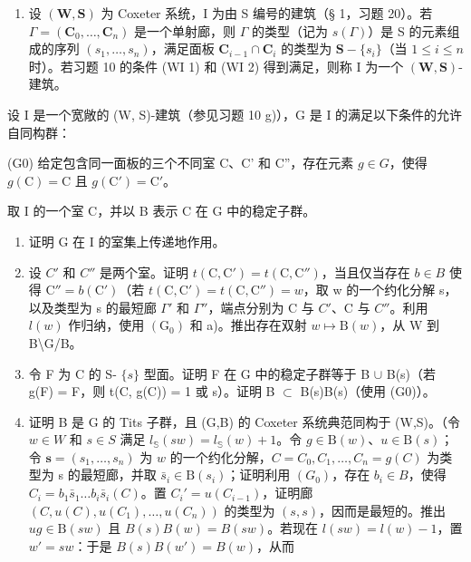\begin{enumerate}
\def\labelenumi{\arabic{enumi})}
\setcounter{enumi}{10}
\tightlist
\item
  设 \((\mathbf{W},\mathbf{S})\) 为 Coxeter 系统，I 为由 S 编号的建筑（§ 1，习题 20）。若 \(\Gamma = (\mathbf{C}_0,\dots ,\mathbf{C}_n)\) 是一个单射廊，则 \(\Gamma\) 的类型（记为 \(s(\Gamma)\)）是 S 的元素组成的序列 \((s_1,\ldots ,s_n)\)，满足面板 \(\mathbf{C}_{i - 1}\cap \mathbf{C}_i\) 的类型为 \(\mathbf{S} - \{s_i\}\)（当 \(1\leqslant i\leqslant n\) 时）。若习题 10 的条件 (WI 1) 和 (WI 2) 得到满足，则称 I 为一个 \((\mathbf{W},\mathbf{S})\)-建筑。
\end{enumerate}

设 I 是一个宽敞的 (W, S)-建筑（参见习题 10 g)），G 是 I 的满足以下条件的允许自同构群：

(G0) 给定包含同一面板的三个不同室 C、C' 和 C''，存在元素 \(g \in G\)，使得 \(g(\mathrm{C}) = \mathrm{C}\) 且 \(g(\mathrm{C}') = \mathrm{C}'\)。

取 I 的一个室 C，并以 B 表示 C 在 G 中的稳定子群。

\begin{enumerate}
\def\labelenumi{\alph{enumi})}
\item
  证明 G 在 I 的室集上传递地作用。
\item
  设 \(C'\) 和 \(C''\) 是两个室。证明 \(t(\mathrm{C},\mathrm{C}') = t(\mathrm{C},\mathrm{C}'')\)，当且仅当存在 \(b \in B\) 使得 \(\mathrm{C}'' = b(\mathrm{C}')\)（若 \(t(\mathrm{C},\mathrm{C}') = t(\mathrm{C},\mathrm{C}'') = w\)，取 w 的一个约化分解 s，以及类型为 s 的最短廊 \(\Gamma'\) 和 \(\Gamma''\)，端点分别为 C 与 \(C'\)、C 与 \(C''\)。利用 \(l(w)\) 作归纳，使用 \((\mathrm{G}_{0})\) 和 a)。推出存在双射 \(w \mapsto \mathrm{B}(w)\)，从 W 到 B\textbackslash G/B。
\item
  令 F 为 C 的 S- \(\{s\}\) 型面。证明 F 在 G 中的稳定子群等于 B \(\cup\) B(s)（若 g(F) = F，则 t(C, g(C)) = 1 或 s）。证明 B \(\subset\) B(s)B(s)（使用 (G0)）。
\item
  证明 B 是 G 的 Tits 子群，且 (G,B) 的 Coxeter 系统典范同构于 (W,S)。（令 \(w \in W\) 和 \(s \in S\) 满足 \(l_{\mathbb{S}}(sw) = l_{\mathbb{S}}(w) + 1\)。令 \(g \in \mathrm{B}(w)\)、\(u \in \mathrm{B}(s)\)；令 \(\mathbf{s} = (s_1, \ldots, s_n)\) 为 \(w\) 的一个约化分解，\(C = C_0, C_1, \ldots, C_n = g(C)\) 为类型为 s 的最短廊，并取 \(\bar{s}_i \in \mathrm{B}(s_i)\)；证明利用 \((G_0)\)，存在 \(b_i \in B\)，使得 \(C_i = b_1 \bar{s}_1 \ldots b_i \bar{s}_i(C)\)。置 \(C_i' = u(C_{i-1})\)，证明廊 \((C, u(C), u(C_1), \ldots, u(C_n))\) 的类型为 \((s, s)\)，因而是最短的。推出 \(ug \in \mathrm{B}(sw)\) 且 \(B(s) B(w) = B(sw)\)。若现在 \(l(sw) = l(w) - 1\)，置 \(w' = sw\)：于是 \(B(s) B(w') = B(w)\)，从而
\end{enumerate}

